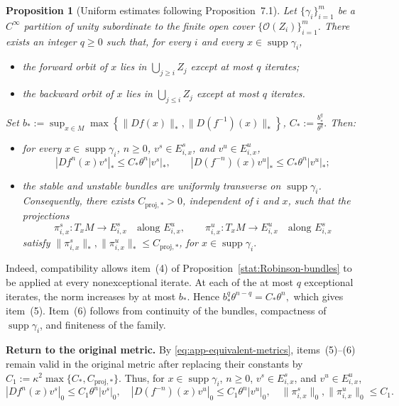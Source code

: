 \documentclass[12pt]{article}
\DeclareMathOperator{\supp}{supp}
\newtheorem{statement}[thm]{Proposition}
\theoremstyle{definition}
\begin{document}
\begin{statement}[Uniform estimates following Proposition~7.1]\label{stat:Robinson-uniform}
Let $\{\gamma_i\}_{i=1}^m$ be a $C^{\infty}$ partition of unity subordinate to the finite open cover $\{\mathcal O(Z_i)\}_{i=1}^m$. There exists an integer $q\geq0$ such that, for every $i$ and every $x\in\supp\gamma_i$,
\begin{itemize}
\item the forward orbit of $x$ lies in $\bigcup_{j\geq i}Z_j$ except at most $q$ iterates;
\item the backward orbit of $x$ lies in $\bigcup_{j\leq i}Z_j$ except at most $q$ iterates.
\end{itemize}
Set
$
b_*:=\sup_{x\in M}\max\left\{\|Df(x)\|_*,\|D(f^{-1})(x)\|_*\right\}$, 
$C_*:=\frac{b_*^q}{\theta^q}.
$
Then:
\begin{itemize}
\item[(5)] for every $x\in\supp\gamma_i$, $n\geq0$, $v^s\in E_{i,x}^s$, and $v^u\in E_{i,x}^u$,
\begin{equation}\label{eq:app-Robinson-stable}
|Df^n(x)v^s|_*\leq C_*\theta^n|v^s|_*, 
\qquad 
|D(f^{-n})(x)v^u|_*\leq C_*\theta^n|v^u|_*;
\end{equation}
\item[(6)] the stable and unstable bundles are uniformly transverse on
$\operatorname{supp}\gamma_i$. Consequently, there exists
$C_{\mathrm{proj},*}>0$, independent of $i$ and $x$, such that the
projections
\[
\pi_{i,x}^s:T_xM\to E_{i,x}^s
\quad\text{along }E_{i,x}^u,
\qquad
\pi_{i,x}^u:T_xM\to E_{i,x}^u
\quad\text{along }E_{i,x}^s
\]
satisfy
$
\|\pi_{i,x}^s\|_*,
\|\pi_{i,x}^u\|_*
\leq C_{\mathrm{proj},*}$, for
$x\in\operatorname{supp}\gamma_i.
$
\end{itemize}
\end{statement}

Indeed, compatibility allows item~(4) of Proposition~\ref{stat:Robinson-bundles} to be applied at every nonexceptional iterate. At each of the at most $q$ exceptional iterates, the norm increases by at most $b_*$. Hence
$
b_*^q\theta^{n-q}=C_*\theta^n,
$
which gives item~(5). Item~(6) follows from continuity of the bundles, compactness of $\supp\gamma_i$, and finiteness of the family.

\noindent\textbf{Return to the original metric.}
By \eqref{eq:app-equivalent-metrics}, items~(5)--(6) remain valid in the
original metric after replacing their constants by
$
C_1:=\kappa^2\max\{C_*,C_{\mathrm{proj},*}\}.
$
Thus, for $x\in\supp\gamma_i$, $n\geq0$,
$v^s\in E_{i,x}^s$, and $v^u\in E_{i,x}^u$,
\begin{equation}
\label{eq:app-original-estimates}
|Df^n(x)v^s|_0\leq C_1\theta^n|v^s|_0,
\quad
|D(f^{-n})(x)v^u|_0\leq C_1\theta^n|v^u|_0, \quad \|\pi_{i,x}^s\|_0,\|\pi_{i,x}^u\|_0\leq C_1.
\end{equation}
\end{document}
